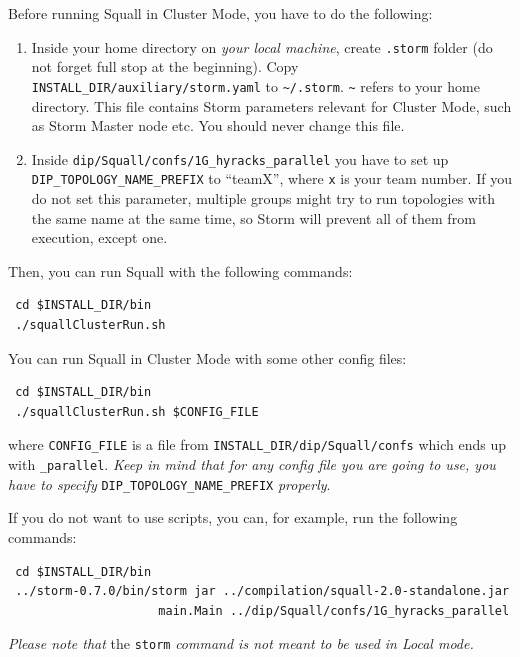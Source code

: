 \documentclass[a4paper,10pt]{article}
\begin{document}
Before running Squall in Cluster Mode, you have to do the following:
\begin{enumerate}
 \item Inside your home directory on \textit{your local machine}, create \verb#.storm# folder (do not forget full stop at the beginning). Copy \verb#INSTALL_DIR/auxiliary/storm.yaml# to \verb#~/.storm#. \verb#~# refers to your home directory. This file contains Storm parameters relevant for Cluster Mode, such as Storm Master node etc. You should never change this file.
 \item Inside  \verb#dip/Squall/confs/1G_hyracks_parallel# you have to set up \\ \verb#DIP_TOPOLOGY_NAME_PREFIX# to ``teamX'', where \verb#x# is your team number. If you do not set this parameter, multiple groups might try to run topologies with the same name at the same time, so Storm will prevent all of them from execution, except one.
\end{enumerate}

Then, you can run Squall with the following commands:
\begin{verbatim}
 cd $INSTALL_DIR/bin
 ./squallClusterRun.sh
\end{verbatim}

You can run Squall in Cluster Mode with some other config files:
\begin{verbatim}
 cd $INSTALL_DIR/bin
 ./squallClusterRun.sh $CONFIG_FILE
\end{verbatim}
where \verb#CONFIG_FILE# is a file from \verb#INSTALL_DIR/dip/Squall/confs# which ends up with \verb#_parallel#. \textit{Keep in mind that for any config file you are going to use, you have to specify} \verb#DIP_TOPOLOGY_NAME_PREFIX# \textit{properly}.

If you do not want to use scripts, you can, for example, run the following commands:
\begin{verbatim}
 cd $INSTALL_DIR/bin
 ../storm-0.7.0/bin/storm jar ../compilation/squall-2.0-standalone.jar
                     main.Main ../dip/Squall/confs/1G_hyracks_parallel
\end{verbatim}

\textit{Please note that} the \verb|storm| \textit{command is not meant to be used in Local mode.}
\end{document}
